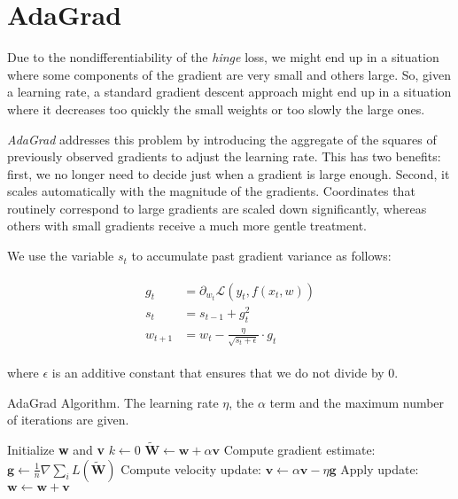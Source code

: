 \section{AdaGrad}

Due to the nondifferentiability of the \emph{hinge} loss, we might end up in a situation where some components of the gradient are very small and others large. So, given a learning rate, a standard gradient descent approach might end up in a situation where it decreases too quickly the small weights or too slowly the large ones.

\emph{AdaGrad} \cite{duchi2011adaptive} addresses this problem by introducing the aggregate of the squares of previously observed gradients to adjust the learning rate. This has two benefits: first, we no longer need to decide just when a gradient is large enough. Second, it scales automatically with the magnitude of the gradients. Coordinates that routinely correspond to large gradients are scaled down significantly, whereas others with small gradients receive a much more gentle treatment.

We use the variable $s_t$ to accumulate past gradient variance as follows:
	
\begin{equation} \label{eq:adagrad}
	\begin{split}
    	\begin{aligned}
        	g_t & = \partial_{{w_t}} \mathcal{L}(y_t, f(x_t, w)) \\
        	s_t & = s_{t-1} + g_t^2 \\
        	w_{t+1} & = w_t - \frac{\eta}{\sqrt{s_t + \epsilon}} \cdot g_t
    	\end{aligned}
	\end{split}
\end{equation}

where $\epsilon$ is an additive constant that ensures that we do not divide by 0. 

\begin{algorithm}[h!]
	\caption{AdaGrad Algorithm. The learning rate $\eta$, the $\alpha$ term and the maximum number of iterations are given.}
	\label{alg:adagrad}
	\begin{algorithmic}[1]
			\State Initialize \textbf{w} and \textbf{v}
			\State $k \gets 0$
					\State $\tilde{\textbf{W}} \gets \textbf{w} + \alpha \textbf{v}$
				\EndIf
				\State Compute gradient estimate: $\textbf{g} \gets \frac {1}{n} \nabla \sum_i\textit{L}(\tilde{\textbf{W}})$
				\State Compute velocity update: $\textbf{v} \gets \alpha \textbf{v} - \eta \textbf{g}$
				\State Apply update: $\textbf{w} \gets \textbf{w} + \textbf{v}$
			\EndWhile
		\EndProcedure
	\end{algorithmic}
\end{algorithm}
